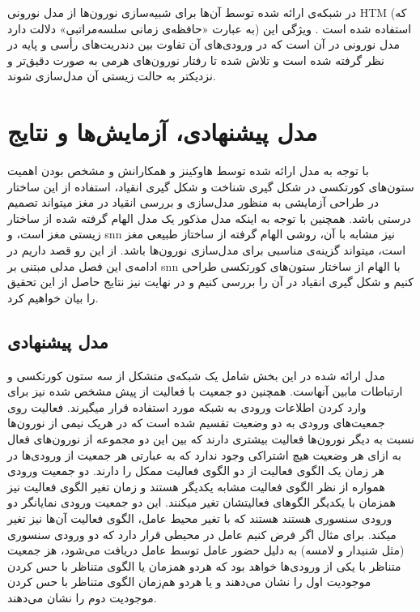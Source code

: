 \documentclass[12pt]{report}
\begin{document}
در شبکه‌ی ارائه شده توسط آن‌ها برای شبیه‌سازی نورون‌ها از مدل نورونی HTM (که به عبارت «حافظه‌ی زمانی سلسه‌مراتبی» دلالت دارد) استفاده شده است \cite{HTM2011}.
ویژگی این مدل نورونی در آن است که در ورودی‌های آن تفاوت بین دندریت‌های رأسی و پایه در نظر گرفته شده است و تلاش شده تا رفتار نورون‌های هرمی به صورت دقیق‌تر و نزدیکتر به حالت زیستی آن مدل‌سازی شوند.
	
	\chapter{مدل پیشنهادی، آزمایش‌ها و نتایج}
	
	با توجه به مدل ارائه شده توسط هاوکینز و همکارانش و مشخص بودن اهمیت ستون‌های کورتکسی در شکل گیری شناخت و شکل گیری انقیاد، استفاده از این ساختار در طراحی آزمایشی به منظور مدل‌سازی و بررسی انقیاد در مغز میتواند تصمیم درستی باشد. همچنین با توجه به اینکه مدل مذکور یک مدل الهام گرفته شده از ساختار زیستی مغز است، و \gls{snn} نیز مشابه با آن، روشی الهام گرفته از ساختاز طبیعی مغز است، میتواند گزینه‌ی مناسبی برای مدل‌سازی نورون‌ها باشد. از این رو قصد داریم در ادامه‌ی این فصل مدلی مبتنی بر \gls{snn} با الهام از ساختار ستون‌های کورتکسی طراحی کنیم و شکل گیری انقیاد در آن را بررسی کنیم و در نهایت نیز نتایج حاصل از این تحقیق را بیان خواهیم کرد.
	
	\section{مدل پیشنهادی}
	
	مدل ارائه شده در این بخش شامل یک شبکه‌ی متشکل از سه ستون کورتکسی و ارتباطات مابین آنهاست. همچنین دو جمعیت با فعالیت از پیش مشخص شده نیز برای وارد کردن اطلاعات ورودی به شبکه مورد استفاده قرار میگیرند. فعالیت روی جمعیت‌های ورودی به دو وضعیت تقسیم شده است که در هریک نیمی از نورون‌ها نسبت به دیگر نورون‌ها فعالیت بیشتری دارند که بین این دو مجموعه از نورون‌های فعال به ازای هر وضعیت هیچ اشتراکی وجود ندارد که به عبارتی هر جمعیت از ورودی‌ها در هر زمان یک الگوی فعالیت از دو الگوی فعالیت ممکل را دارند. دو جمعیت ورودی همواره از نظر الگوی فعالیت مشابه یکدیگر هستند و زمان تغیر الگوی فعالیت نیز همزمان با یکدیگر الگو‌های فعالیتشان تغیر میکنند. این دو جمعیت ورودی نمایانگر دو ورودی سنسوری هستند هستند که با تغیر محیط عامل، الگوی فعالیت آن‌ها نیز تغیر میکند. برای مثال اگر فرض کنیم عامل در محیطی قرار دارد که دو ورودی سنسوری (مثل شنیدار و لامسه) به دلیل حضور عامل توسط عامل دریافت می‌شود، هز جمعیت متناظر با یکی از ورودی‌ها خواهد بود که هردو همزمان یا الگوی متناظر با حس کردن موجودیت اول را نشان‌ می‌دهند و یا هردو هم‌زمان الگوی متناظر با حس کردن موجودیت دوم را نشان می‌دهند.
	
\end{document}
